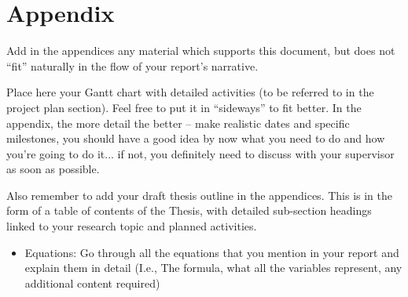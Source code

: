 \pagebreak
\section*{Appendix}

Add in the appendices any material which supports this document, but does not “fit” naturally in the flow of your report’s narrative.

Place here your Gantt chart with detailed activities (to be referred to in the project plan section). Feel free to put it in “sideways” to fit better. In the appendix, the more detail the better – make realistic dates and specific milestones, you should have a good idea by now what you need to do and how you’re going to do it... if not, you definitely need to discuss with your supervisor as soon as possible.

Also remember to add your draft thesis outline in the appendices. This is in the form of a table of contents of the Thesis, with detailed sub-section headings linked to your research topic and planned activities.

\begin{itemize}
    \item Equations: Go through all the equations that you mention in your report and explain them in detail (I.e., The formula, what all the variables represent, any additional content required)
\end{itemize}